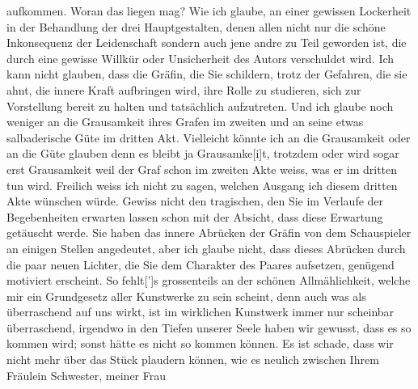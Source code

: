 \begin{ledgroupsized}[t]{13cm}
               aufkommen. Woran das liegen mag? Wie ich glaube, an einer gewissen Lockerheit in der
               Behandlung der drei Hauptgestalten, denen allen nicht nur die schöne Inkonsequenz der
               Leidenschaft sondern auch jene andre zu Teil geworden ist, die durch eine gewisse
               Willkür oder Unsicherheit des Autors verschuldet wird. Ich kann nicht glauben, dass
               die Gräfin, die Sie schildern, trotz der Gefahren, die sie ahnt, die innere Kraft
               aufbringen wird, ihre Rolle zu studieren, sich zur Vorstellung bereit zu halten und
               tatsächlich aufzutreten. Und ich glaube noch weniger an die Grausamkeit ihres Grafen
               im zweiten und an seine etwas salbaderische Güte im dritten Akt. Vielleicht könnte ich
               an die Grausamkeit oder an {\pb}die Güte glauben  denn es bleibt ja Grausamke{[}i{]}t,
               trotzdem oder wird sogar erst Grausamkeit weil der Graf schon im zweiten Akte weiss,
               was er im dritten tun wird. Freilich weiss ich nicht zu sagen, welchen Ausgang ich
               diesem dritten Akte wünschen würde. Gewiss nicht den tragischen, den Sie im Verlaufe
               der Begebenheiten erwarten lassen schon mit der Absicht, dass diese Erwartung
               getäuscht werde. Sie haben das innere Abrücken der Gräfin von dem Schauspieler an
               einigen Stellen angedeutet, aber ich glaube nicht, dass dieses Abrücken durch die
               paar neuen Lichter, die Sie dem Charakter des Paares aufsetzen, genügend motiviert
               erscheint. So fehlt{[}’{]}s grossenteils an der schönen
               Allmählichkeit, welche mir ein Grundgesetz aller Kunstwerke zu sein scheint, denn
               auch was als überraschend auf uns wirkt, ist im wirklichen Kunstwerk immer nur
               scheinbar überraschend, irgendwo in den Tiefen unserer Seele haben wir gewusst, dass
               es so kommen wird; sonst hätte es nicht so kommen können.\pend
           \pstart
           {\pb}Es ist schade, dass wir nicht mehr über das Stück plaudern können, wie es
               neulich zwischen Ihrem Fräulein Schwester, meiner Frau

\end{ledgroupsized}
